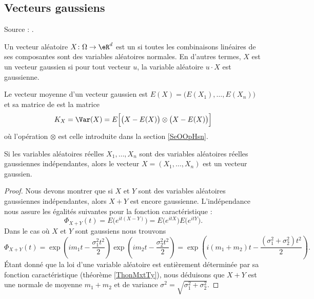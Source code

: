\subsection{Vecteurs gaussiens}

Source : \cite{ProbaDanielLi,GaussienYoann}.

\begin{definition}
    Un vecteur aléatoire \( X\colon \Omega\to \eR^d\) est un  si toutes les combinaisons linéaires de ses composantes sont des variables aléatoires normales. En d'autres termes, \( X\) est un vecteur gaussien si pour tout vecteur \( u\), la variable aléatoire \( u\cdot X\) est gaussienne.
\end{definition}

Le vecteur moyenne d'un vecteur gaussien est \( E(X)=\big( E(X_1),\ldots, E(X_n) \big)\) et sa matrice de  est la matrice
\begin{equation}
    K_X=\Var(X)=E\Big[ \big( X-E(X) \big)\otimes \big( X-E(X) \big) \Big]
\end{equation}
où l'opération \( \otimes\) est celle introduite dans la section \ref{SeOOpHsn}.

\begin{lemma}
    Si les variables aléatoires réelles \( X_1,\ldots, X_n\) sont des variables aléatoires réelles gaussiennes indépendantes, alors le vecteur \( X=(X_1,\ldots, X_n)\) est un vecteur gaussien.
\end{lemma}

\begin{proof}
    Nous devons montrer que si \( X\) et \( Y\) sont des variables aléatoires gaussiennes indépendantes, alors \( X+Y\) est encore gaussienne. L'indépendance nous assure les égalités suivantes pour la fonction caractéristique :
    \begin{equation}
        \Phi_{X+Y}(t)=E\big(  e^{it(X-Y)} \big)=E\big(  e^{itX} \big)E\big(  e^{itY} \big).
    \end{equation}
    Dans le cas où \( X\) et \( Y\) sont gaussiens nous trouvons
    \begin{equation}
        \Phi_{X+Y}(t)=\exp\left( im_1t-\frac{ \sigma_1^2t^2 }{2} \right)\exp\left( im_2t-\frac{ \sigma_2^2t^2 }{2} \right)=\exp\left( i(m_1+m_2)t-\frac{ (\sigma_1^2+\sigma_2^2)t^2 }{2} \right).
    \end{equation}
    Étant donné que la loi d'une variable aléatoire est entièrement déterminée par sa fonction caractéristique (théorème \ref{ThonMxtTy}), nous déduisons que \( X+Y\) est une normale de moyenne \( m_1+m_2\) et de variance \( \sigma^2=\sqrt{\sigma_1^2+\sigma_2^2}\).
\end{proof}

